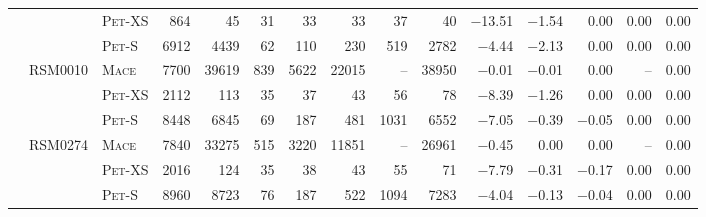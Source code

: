 \begin{tabular}{lllr rrrrrr rrrrr}
                  &                    &   \textsc{Pet}-XS  &         \num{864}  &          \num{45}  &          \num{31}  &          \num{33}  &          \num{33}  &          \num{37}  &          \num{40}  &      \num{-13.51}  &       \num{-1.54}  &        \num{0.00}  &        \num{0.00}  &        \num{0.00} \\ 
                  &                    &    \textsc{Pet}-S  &        \num{6912}  &        \num{4439}  &          \num{62}  &         \num{110}  &         \num{230}  &         \num{519}  &        \num{2782}  &       \num{-4.44}  &       \num{-2.13}  &        \num{0.00}  &        \num{0.00}  &        \num{0.00} \\ 
\addlinespace
                  &           RSM0010  &     \textsc{Mace}  &        \num{7700}  &       \num{39619}  &         \num{839}  &        \num{5622}  &       \num{22015}  &                --  &       \num{38950}  &       \num{-0.01}  &       \num{-0.01}  &        \num{0.00}  &                --  &        \num{0.00} \\ 
                  &                    &   \textsc{Pet}-XS  &        \num{2112}  &         \num{113}  &          \num{35}  &          \num{37}  &          \num{43}  &          \num{56}  &          \num{78}  &       \num{-8.39}  &       \num{-1.26}  &        \num{0.00}  &        \num{0.00}  &        \num{0.00} \\ 
                  &                    &    \textsc{Pet}-S  &        \num{8448}  &        \num{6845}  &          \num{69}  &         \num{187}  &         \num{481}  &        \num{1031}  &        \num{6552}  &       \num{-7.05}  &       \num{-0.39}  &       \num{-0.05}  &        \num{0.00}  &        \num{0.00} \\ 
\addlinespace
                  &           RSM0274  &     \textsc{Mace}  &        \num{7840}  &       \num{33275}  &         \num{515}  &        \num{3220}  &       \num{11851}  &                --  &       \num{26961}  &       \num{-0.45}  &        \num{0.00}  &        \num{0.00}  &                --  &        \num{0.00} \\ 
                  &                    &   \textsc{Pet}-XS  &        \num{2016}  &         \num{124}  &          \num{35}  &          \num{38}  &          \num{43}  &          \num{55}  &          \num{71}  &       \num{-7.79}  &       \num{-0.31}  &       \num{-0.17}  &        \num{0.00}  &        \num{0.00} \\ 
                  &                    &    \textsc{Pet}-S  &        \num{8960}  &        \num{8723}  &          \num{76}  &         \num{187}  &         \num{522}  &        \num{1094}  &        \num{7283}  &       \num{-4.04}  &       \num{-0.13}  &       \num{-0.04}  &        \num{0.00}  &        \num{0.00} \\ 

\end{tabular}
